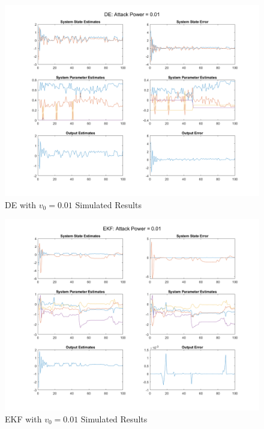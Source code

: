 \documentclass[]{ieeetran}
\begin{document}
\begin{figure}
	\centering
	\includegraphics[width=\linewidth]{../../fig/DE_attack_0_01}
	\caption{DE with $v_0 = 0.01$ Simulated Results}
	\label{fig:deattack001}
\end{figure}

\begin{figure}
	\centering
	\includegraphics[width=\linewidth]{../../fig/EKF_attack_0_01}
	\caption{EKF with $v_0 = 0.01$ Simulated Results}
	\label{fig:ekfattack001}
\end{figure}
\end{document}
